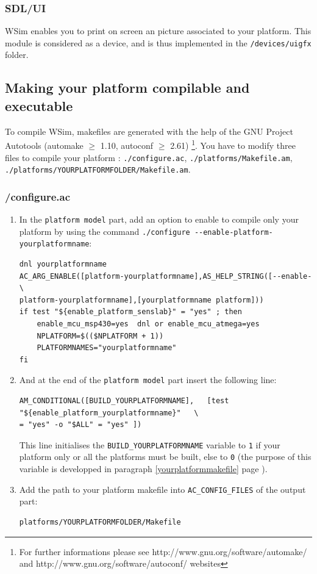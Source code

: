 \documentclass[a4paper,10pt]{report}
\begin{document}
\subsubsection{SDL/UI}

WSim enables you to print on screen an picture associated to your platform. This module is considered as a device, and is thus implemented in the \verb$/devices/uigfx$ folder.


\subsection{Making your platform compilable and executable}
\label{platform-compilation}
To compile WSim, makefiles are generated with the help of the GNU Project Autotools (automake $\ge$ 1.10, autoconf $\ge$ 2.61) \footnote{For further informations please see http://www.gnu.org/software/automake/ and 
http://www.gnu.org/software/autoconf/ websites}.
You have to modify three files to compile your platform : \verb$./configure.ac$, \verb$./platforms/Makefile.am$, \verb$./platforms/YOURPLATFORMFOLDER/Makefile.am$.

\subsubsection{/configure.ac}
\begin{enumerate}
  \item In the \verb$platform model$ part, add an option to enable to compile only your platform by using the command \verb$./configure --enable-platform-yourplatformname$:
\begin{verbatim}
dnl yourplatformname
AC_ARG_ENABLE([platform-yourplatformname],AS_HELP_STRING([--enable-\
platform-yourplatformname],[yourplatformname platform]))
if test "${enable_platform_senslab}" = "yes" ; then
	enable_mcu_msp430=yes  dnl or enable_mcu_atmega=yes
	NPLATFORM=$(($NPLATFORM + 1))
	PLATFORMNAMES="yourplatformname"
fi
\end{verbatim}

  \item And at the end of the \verb$platform model$ part insert the following line:
\begin{verbatim}
AM_CONDITIONAL([BUILD_YOURPLATFORMNAME],   [test "${enable_platform_yourplatformname}"   \
= "yes" -o "$ALL" = "yes" ])
\end{verbatim}
This line initialises the \verb$BUILD_YOURPLATFORMNAME$ variable to \verb$1$ if your platform only or all the platforms must be built, else to \verb$0$ (the purpose of this variable is developped in paragraph \ref{yourplatformmakefile} page \pageref{yourplatformmakefile}).\\

  \item Add the path to your platform makefile into \verb$AC_CONFIG_FILES$ of the output part: 
\begin{verbatim}
platforms/YOURPLATFORMFOLDER/Makefile
\end{verbatim}
\end{enumerate}
\end{document}
